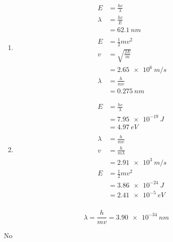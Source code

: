 \documentclass{article}
\begin{document}
\begin{enumerate}
  \item

        \begin{align*}
          E       & = \frac{h c}{\lambda}  \\
          \lambda & = \frac{h c}{E}        \\
                  & = \qty{62.1}{nm}       \\ \\
          E       & = \frac{1}{2} m v^2    \\
          v       & = \sqrt{\frac{2 E}{m}} \\
                  & = \qty{2.65e6}{m/s}    \\
          \lambda & = \frac{h}{m v}        \\
                  & = \qty{0.275}{nm}
        \end{align*}

  \item

        \begin{align*}
          E       & = \frac{h c}{\lambda} \\
                  & = \qty{7.95e-19}{J}   \\
                  & = \qty{4.97}{eV}      \\ \\
          \lambda & = \frac{h}{m v}       \\
          v       & = \frac{h}{m \lambda} \\
                  & = \qty{2.91e3}{m/s}   \\
          E       & = \frac{1}{2} m v^2   \\
                  & = \qty{3.86e-24}{J}   \\
                  & = \qty{2.41e-5}{eV}
        \end{align*}
\end{enumerate}

\setcounter{subsubsection}{8}
\subsubsection{}

\[\lambda = \frac{h}{m v} = \qty{3.90e-34}{nm}\]

No

\setcounter{subsubsection}{10}
\subsubsection{}
\end{document}
